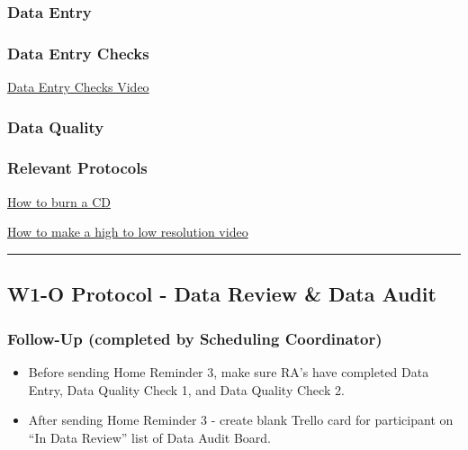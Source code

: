 \documentclass[
]{book}
\providecommand{\tightlist}{%
  \setlength{\itemsep}{0pt}\setlength{\parskip}{0pt}}
\begin{document}
\hypertarget{data-entry-3}{%
\subsubsection{Data Entry}\label{data-entry-3}}

\hypertarget{data-entry-checks}{%
\subsubsection{Data Entry Checks}\label{data-entry-checks}}

\href{https://app.box.com/file/805857407548}{Data Entry Checks Video}

\hypertarget{data-quality-2}{%
\subsubsection{Data Quality}\label{data-quality-2}}

\hypertarget{relevant-protocols}{%
\subsubsection{Relevant Protocols}\label{relevant-protocols}}

\href{https://bablab.github.io/wiki_bablab/lab-protocols.html\#burning-cd}{How to burn a CD}

\href{https://bablab.github.io/wiki_bablab/lab-protocols.html\#high-to-low-res-video}{How to make a high to low resolution video}

\begin{center}\rule{0.5\linewidth}{0.5pt}\end{center}

\hypertarget{w1-o-protocol---data-review-data-audit}{%
\subsection{W1-O Protocol - Data Review \& Data Audit}\label{w1-o-protocol---data-review-data-audit}}

\hypertarget{follow-up-completed-by-scheduling-coordinator-1}{%
\subsubsection{Follow-Up (completed by Scheduling Coordinator)}\label{follow-up-completed-by-scheduling-coordinator-1}}

\begin{itemize}
\tightlist
\item
  Before sending Home Reminder 3, make sure RA's have completed Data Entry, Data Quality Check 1, and Data Quality Check 2.
\item
  After sending Home Reminder 3 - create blank Trello card for participant on ``In Data Review'' list of Data Audit Board.
\end{itemize}
\end{document}
